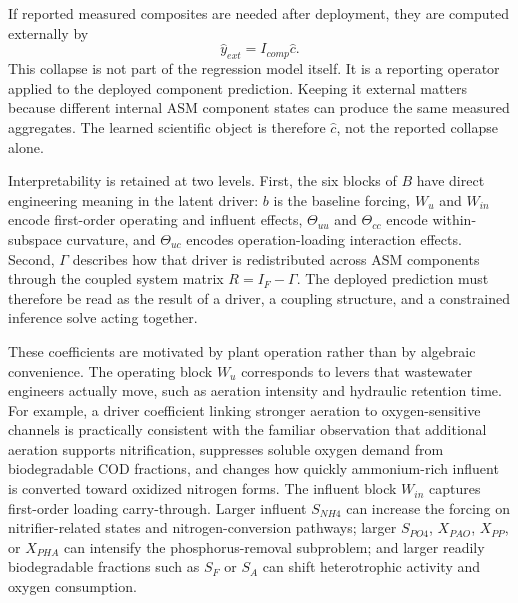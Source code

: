 \documentclass[11pt]{article}
\begin{document}
If reported measured composites are needed after deployment, they are computed externally by
\[
\hat{y}_{ext} = I_{comp}\hat{c}.
\]
This collapse is not part of the regression model itself. It is a reporting operator applied to the deployed component prediction. Keeping it external matters because different internal ASM component states can produce the same measured aggregates. The learned scientific object is therefore $\hat{c}$, not the reported collapse alone.

Interpretability is retained at two levels. First, the six blocks of $B$ have direct engineering meaning in the latent driver: $b$ is the baseline forcing, $W_u$ and $W_{in}$ encode first-order operating and influent effects, $\Theta_{uu}$ and $\Theta_{cc}$ encode within-subspace curvature, and $\Theta_{uc}$ encodes operation-loading interaction effects. Second, $\Gamma$ describes how that driver is redistributed across ASM components through the coupled system matrix $R = I_F - \Gamma$. The deployed prediction must therefore be read as the result of a driver, a coupling structure, and a constrained inference solve acting together.

These coefficients are motivated by plant operation rather than by algebraic convenience. The operating block $W_u$ corresponds to levers that wastewater engineers actually move, such as aeration intensity and hydraulic retention time. For example, a driver coefficient linking stronger aeration to oxygen-sensitive channels is practically consistent with the familiar observation that additional aeration supports nitrification, suppresses soluble oxygen demand from biodegradable COD fractions, and changes how quickly ammonium-rich influent is converted toward oxidized nitrogen forms. The influent block $W_{in}$ captures first-order loading carry-through. Larger influent $S_{NH4}$ can increase the forcing on nitrifier-related states and nitrogen-conversion pathways; larger $S_{PO4}$, $X_{PAO}$, $X_{PP}$, or $X_{PHA}$ can intensify the phosphorus-removal subproblem; and larger readily biodegradable fractions such as $S_F$ or $S_A$ can shift heterotrophic activity and oxygen consumption.
\end{document}
